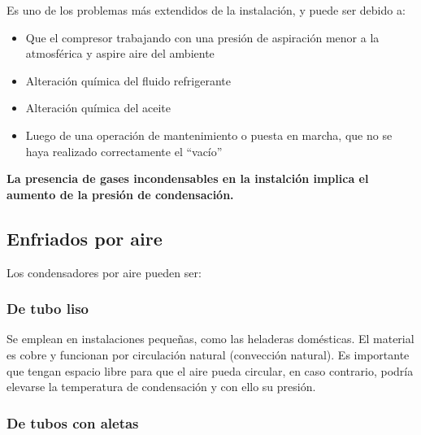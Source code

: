 Es uno de los problemas m\'as extendidos de la instalaci\'on, y puede ser debido a:
\begin{itemize}
    \item Que el compresor trabajando con una presi\'on de aspiraci\'on menor a la atmosf\'erica y aspire aire del ambiente
    \item Alteraci\'on qu\'imica del fluido refrigerante
    \item Alteraci\'on qu\'imica del aceite
    \item Luego de una operaci\'on de mantenimiento o puesta en marcha, que no se haya realizado correctamente el ``vac\'io''
\end{itemize}
\textbf{La presencia de gases incondensables en la instalci\'on implica el aumento de la presi\'on de condensaci\'on.}

\subsection{Enfriados por aire}

Los condensadores por aire pueden ser:

\subsubsection{De tubo liso}

Se emplean en instalaciones peque\~{n}as, como las heladeras dom\'esticas. El material es cobre y funcionan por circulaci\'on natural (convecci\'on natural). Es importante que tengan espacio libre para que el aire pueda circular, en caso contrario, podr\'ia elevarse la temperatura de condensaci\'on y con ello su presi\'on.

\subsubsection{De tubos con aletas}

